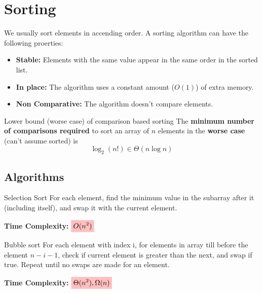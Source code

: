\section{Sorting}

We usually sort elements in accending order.
A sorting algorithm can have the following proerties:
\begin{itemize}
    \item \textbf{Stable:} Elements with the same value appear in the same order in the sorted list.
    \item \textbf{In place:} The algorithm uses a constant amount ($O(1)$) of extra memory.
    \item \textbf{Non Comparative:} The algorithm doesn't compare elements.
\end{itemize}

\begin{theorem}
    {Lower bound (worse case) of comparison based sorting}
    The \textbf{minimum number of comparisons required} to sort an array of $n$ elements in the \textbf{worse case} (can't assume sorted) is
    \[
        \log_2(n!) \in \Theta(n \log n)
    \]
\end{theorem}
\label{thm:lower_bound_sort}

\subsection{Algorithms}

\begin{knBox}
    {Selection Sort}
    For each element, find the minimum value in the subarray after it (including itself), and swap it with the current element.

    \textbf{Time Complexity:} $\mathcolorbox{pink}{O(n^2)}$
\end{knBox}

\begin{knBox}
    {Bubble sort}
    For each element with index i, for elements in array till before the element $n-i-1$, check if current element is greater than the next, and swap if true.  Repeat until no swaps are made for an element.

    \textbf{Time Complexity:} $\mathcolorbox{pink}{\Theta(n^2),\Omega(n)}$
\end{knBox}

